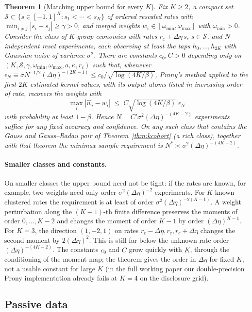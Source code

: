 \documentclass[12pt]{article}
\newtheorem{theorem}{Theorem}[section]
\theoremstyle{definition}
\theoremstyle{remark}
\begin{document}
\begin{theorem}[Matching upper bound for every $K$]\label{prop:esprit}
Fix $K\ge2$, a compact set $\mathcal S\subset\{s\in[-1,1]^K:s_1<\cdots<s_K\}$ of ordered rescaled rates with $\min_{i\ne j}|s_i-s_j|\ge\gamma>0$, and merged weights $w_i\in[\omega_{\min},\omega_{\max}]$ with $\omega_{\min}>0$. Consider the class of $K$-group economies with rates $r_c+\Delta\eta\,s$, $s\in\mathcal S$, and $N$ independent reset experiments, each observing at least the taps $h_0,\ldots,h_{2K}$ with Gaussian noise of variance $\sigma^2$. There are constants $c_0,C>0$ depending only on $(K,\mathcal S,\gamma,\omega_{\min},\omega_{\max},a,\kappa,r_c)$ such that, whenever $\epsilon_N\equiv\sigma N^{-1/2}(\Delta\eta)^{-(2K-1)}\le c_0/\sqrt{\log(4K/\beta)}$, Prony's method applied to the first $2K$ estimated kernel values, with its output atoms listed in increasing order of rate, recovers the weights with
\[
\max_i|\hat w_i-w_i|\;\le\;C\sqrt{\log(4K/\beta)}\;\epsilon_N
\]
with probability at least $1-\beta$. Hence $N=C'\sigma^2(\Delta\eta)^{-(4K-2)}$ experiments suffice for any fixed accuracy and confidence. On any such class that contains the Gauss and Gauss--Radau pair of Theorem~\ref{thm:kcohort} (a rich class), together with that theorem the minimax sample requirement is $N^*\asymp\sigma^2(\Delta\eta)^{-(4K-2)}$.
\end{theorem}

\paragraph{Smaller classes and constants.} On smaller classes the upper bound need not be tight: if the rates are known, for example, two weights need only order $\sigma^2(\Delta\eta)^{-2}$ experiments. For $K$ known clustered rates the requirement is at least of order $\sigma^2(\Delta\eta)^{-2(K-1)}$. A weight perturbation along the $(K-1)$-th finite difference preserves the moments of order $0,\ldots,K-2$ and changes the moment of order $K-1$ by order $(\Delta\eta)^{K-1}$. For $K=3$, the direction $(1,-2,1)$ on rates $r_c-\Delta\eta,r_c,r_c+\Delta\eta$ changes the second moment by $2(\Delta\eta)^2$. This is still far below the unknown-rate order $(\Delta\eta)^{-(4K-2)}$. The constants $c_0$ and $C$ grow quickly with $K$, through the conditioning of the moment map; the theorem gives the order in $\Delta\eta$ for fixed $K$, not a usable constant for large $K$ (in the full working paper our double-precision Prony implementation already fails at $K=4$ on the disclosure grid).
\subsection{Passive data}
\end{document}
